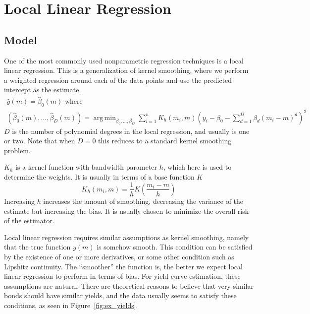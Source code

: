 \documentclass[12pt]{article}
\DeclareMathOperator*{\argmin}{arg\,min}
\begin{document}
\section{Local Linear Regression}

\subsection{Model}

One of the most commonly used nonparametric regression techniques is a local linear regression. This is a generalization of kernel smoothing, where we perform a weighted regression around each of the data points and use the predicted intercept as the estimate.
\begin{equation}
\begin{gathered}
\hat{y}(m) = \hat{\beta}_0(m) \text{ where}\\
(\hat{\beta}_0(m), \dots, \hat{\beta}_D(m))
    = \argmin_{\beta_0, \dots, \beta_D} \sum_{i=1}^n K_h (m_i, m) \left(
        y_i - \beta_0 - \sum_{d=1}^D \beta_d (m_i - m)^d
    \right)^2
\end{gathered} \label{eq:loclin}
\end{equation}
$D$ is the number of polynomial degrees in the local regression, and usually is one or two. Note that when $D = 0$ this reduces to a standard kernel smoothing problem.

$K_h$ is a kernel function with bandwidth parameter $h$, which here is used to determine the weights. It is usually in terms of a base function $K$
\begin{equation}
K_h(m_i, m) = \frac{1}{h} K\left(\frac{m_i - m}{h}\right)
\end{equation}
Increasing $h$ increases the amount of smoothing, decreasing the variance of the estimate but increasing the bias. It is usually chosen to minimize the overall risk of the estimator.

Local linear regression requires similar assumptions as kernel smoothing, namely that the true function $y(m)$ is somehow smooth. This condition can be satisfied by the existence of one or more derivatives, or some other condition such as Lipshitz continuity. The ``smoother'' the function is, the better we expect local linear regression to perform in terms of bias. For yield curve estimation, these assumptions are natural. There are theoretical reasons to believe that very similar bonds should have similar yields, and the data usually seems to satisfy these conditions, as seen in Figure~\ref{fig:ex_yields}.
\end{document}

